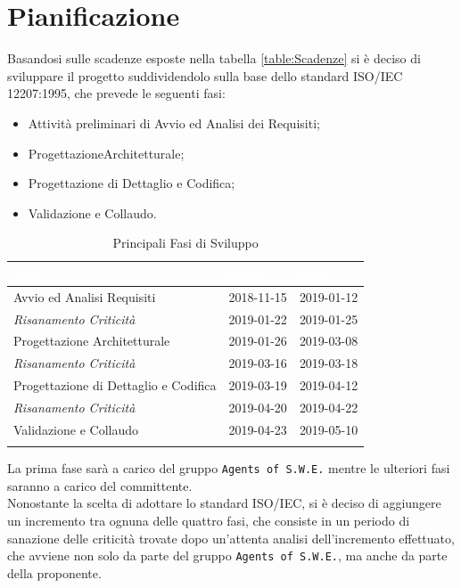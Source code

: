 \section{Pianificazione}
\label{Pianificazione}
Basandosi sulle scadenze esposte nella tabella \ref{table:Scadenze} si è deciso di sviluppare il progetto suddividendolo sulla base dello standard ISO/IEC 12207:1995, che prevede le seguenti fasi:
\begin{itemize}
	\item Attività preliminari di Avvio ed Analisi dei Requisiti;
	\item Progettazione\glossario Architetturale;
	\item Progettazione di Dettaglio e Codifica;
	\item Validazione e Collaudo.
\end{itemize}

\begin{longtable}{|C{.46\textwidth}|C{.20\textwidth}|C{.20\textwidth}|}
\hline
{}\textbf{\textcolor{white}{Fase}} & \textbf{\textcolor{white}{Inizio}} & \textbf{\textcolor{white}{Fine}}
\\
\hline \hline
\endfirsthead
\hline
Avvio ed Analisi Requisiti & 2018-11-15 & 2019-01-12 \\
\hline
{}\textit{Risanamento Criticità} & 2019-01-22 & 2019-01-25 \\
\hline
Progettazione Architetturale & 2019-01-26 & 2019-03-08 \\
\hline
{}\textit{Risanamento Criticità} & 2019-03-16 & 2019-03-18 \\
\hline
Progettazione di Dettaglio e Codifica & 2019-03-19 & 2019-04-12 \\
\hline
{}\textit{Risanamento Criticità} & 2019-04-20 & 2019-04-22 \\
\hline
Validazione e Collaudo & 2019-04-23 & 2019-05-10 \\
\hline
\caption{Principali Fasi di Sviluppo \label{Tabella Fasi di Sviluppo}}
\end{longtable}

La prima fase sarà a carico del gruppo \texttt{Agents of S.W.E.} mentre le ulteriori fasi saranno a carico del committente. \\
Nonostante la scelta di adottare lo standard ISO/IEC, si è deciso di aggiungere un incremento tra ognuna delle quattro fasi, che consiste in un periodo di sanazione delle criticità trovate dopo un'attenta analisi dell'incremento effettuato, che avviene non solo da parte del gruppo \texttt{Agents of S.W.E.}, ma anche da parte della proponente. 

